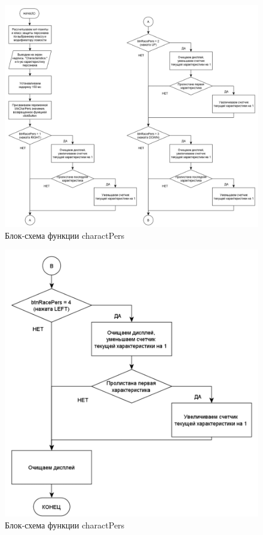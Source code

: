 \documentclass{altsu-report}
\begin{document}
\begin{figure}[H]
    \centering
    \includegraphics[scale=0.8]{charactPers1.png}
    \caption{Блок-схема функции charactPers}
    \label{fig:char1}
\end{figure}

\begin{figure}[H]
    \centering
    \includegraphics[scale=0.6]{charactPers2.png}
    \caption{Блок-схема функции charactPers}
    \label{fig:char2}
\end{figure}
\end{document}
